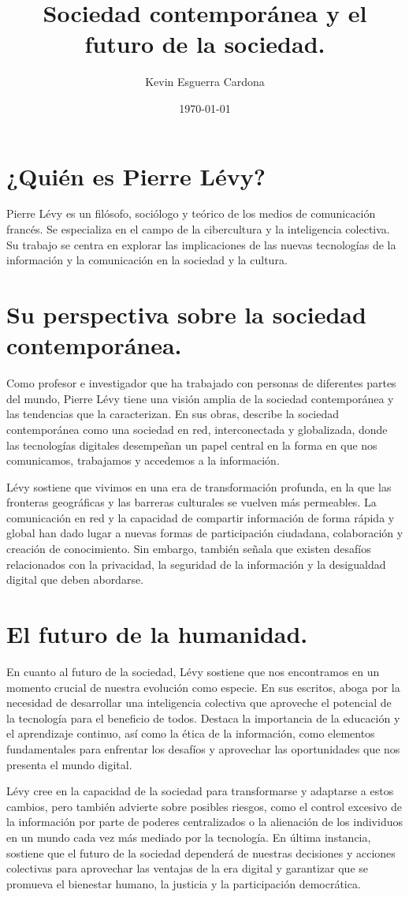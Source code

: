 \documentclass{article}
\title{Sociedad contemporánea y el futuro de la sociedad.}
\author{Kevin Esguerra Cardona}
\date{\today}
\begin{document}
\maketitle

\section*{¿Quién es Pierre Lévy?}
Pierre Lévy es un filósofo, sociólogo y teórico de los medios de comunicación francés. Se especializa en el campo de la cibercultura y la inteligencia colectiva. Su trabajo se centra en explorar las implicaciones de las nuevas tecnologías de la información y la comunicación en la sociedad y la cultura.

\section*{Su perspectiva sobre la sociedad contemporánea.}
Como profesor e investigador que ha trabajado con personas de diferentes partes del mundo, Pierre Lévy tiene una visión amplia de la sociedad contemporánea y las tendencias que la caracterizan. En sus obras, describe la sociedad contemporánea como una sociedad en red, interconectada y globalizada, donde las tecnologías digitales desempeñan un papel central en la forma en que nos comunicamos, trabajamos y accedemos a la información.

Lévy sostiene que vivimos en una era de transformación profunda, en la que las fronteras geográficas y las barreras culturales se vuelven más permeables. La comunicación en red y la capacidad de compartir información de forma rápida y global han dado lugar a nuevas formas de participación ciudadana, colaboración y creación de conocimiento. Sin embargo, también señala que existen desafíos relacionados con la privacidad, la seguridad de la información y la desigualdad digital que deben abordarse.

\section*{El futuro de la humanidad.}
En cuanto al futuro de la sociedad, Lévy sostiene que nos encontramos en un momento crucial de nuestra evolución como especie. En sus escritos, aboga por la necesidad de desarrollar una inteligencia colectiva que aproveche el potencial de la tecnología para el beneficio de todos. Destaca la importancia de la educación y el aprendizaje continuo, así como la ética de la información, como elementos fundamentales para enfrentar los desafíos y aprovechar las oportunidades que nos presenta el mundo digital.

Lévy cree en la capacidad de la sociedad para transformarse y adaptarse a estos cambios, pero también advierte sobre posibles riesgos, como el control excesivo de la información por parte de poderes centralizados o la alienación de los individuos en un mundo cada vez más mediado por la tecnología. En última instancia, sostiene que el futuro de la sociedad dependerá de nuestras decisiones y acciones colectivas para aprovechar las ventajas de la era digital y garantizar que se promueva el bienestar humano, la justicia y la participación democrática.
\end{document}
